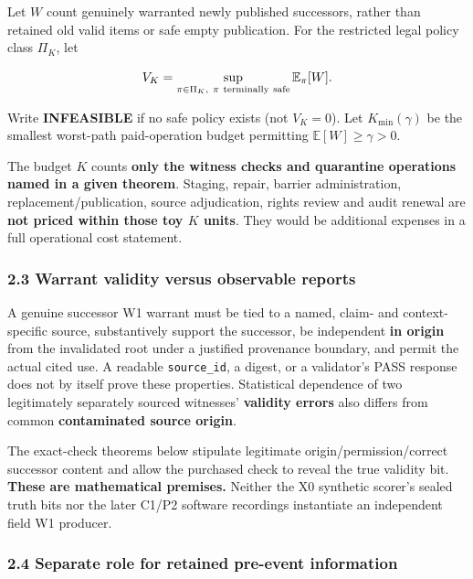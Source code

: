 \documentclass[
  10pt,
  american,
  a4paper,
]{article}
\begin{document}
Let \(W\) count genuinely warranted newly published successors, rather
than retained old valid items or safe empty publication. For the
restricted legal policy class \(\Pi_K\), let

\[
V_K=\sup_{\pi\in\Pi_K,\ \pi\ {\rm terminally\ safe}}\mathbb E_\pi[W].
\]

Write \textbf{INFEASIBLE} if no safe policy exists (not \(V_K=0\)). Let
\(K_{\min}(\gamma)\) be the smallest worst-path paid-operation budget
permitting \(\mathbb E[W]\ge\gamma>0\).

The budget \(K\) counts \textbf{only the witness checks and quarantine
operations named in a given theorem}. Staging, repair, barrier
administration, replacement/publication, source adjudication, rights
review and audit renewal are \textbf{not priced within those toy \(K\)
units}. They would be additional expenses in a full operational cost
statement.

\hypertarget{warrant-validity-versus-observable-reports}{%
\subsubsection{2.3 Warrant validity versus observable
reports}\label{warrant-validity-versus-observable-reports}}

A genuine successor W1 warrant must be tied to a named, claim- and
context-specific source, substantively support the successor, be
independent \textbf{in origin} from the invalidated root under a
justified provenance boundary, and permit the actual cited use. A
readable \texttt{source\_id}, a digest, or a validator's PASS response
does not by itself prove these properties. Statistical dependence of two
legitimately separately sourced witnesses' \textbf{validity errors} also
differs from common \textbf{contaminated source origin}.

The exact-check theorems below stipulate legitimate
origin/permission/correct successor content and allow the purchased
check to reveal the true validity bit. \textbf{These are mathematical
premises.} Neither the X0 synthetic scorer's sealed truth bits nor the
later C1/P2 software recordings instantiate an independent field W1
producer.

\hypertarget{separate-role-for-retained-pre-event-information}{%
\subsubsection{2.4 Separate role for retained pre-event
information}\label{separate-role-for-retained-pre-event-information}}
\end{document}
